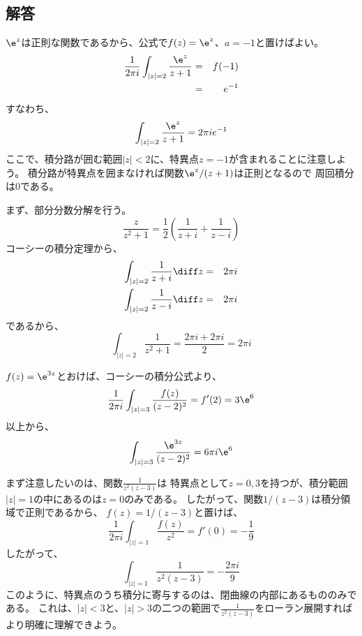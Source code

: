 \subsection{解答}

$\e^{z}$は正則な関数であるから、公式で$f(z)=\e^z$、$a=-1$と置けばよい。
\begin{eqnarray}
  \frac{1}{2\pi i} \int_{|z|=2} \frac{\e^z}{z+1} &=& f(-1)\\
  &=& e^{-1}
\end{eqnarray}
すなわち、
\begin{equation}
  \int_{|z|=2} \frac{\e^z}{z+1} = 2\pi i e^{-1}
\end{equation}
ここで、積分路が囲む範囲$|z|<2$に、特異点$z=-1$が含まれることに注意しよう。
積分路が特異点を囲まなければ関数$\e^z/(z+1)$は正則となるので
周回積分は$0$である。

まず、部分分数分解を行う。
\begin{equation}
  \frac{z}{z^2+1} = \frac{1}{2} \left( \frac{1}{z+i} + \frac{1}{z-i} \right)
\end{equation}
コーシーの積分定理から、
\begin{eqnarray}
  \int_{|z|=2} \frac{1}{z+i} \diff z & =& 2 \pi i \\
  \int_{|z|=2} \frac{1}{z-i} \diff z & =& 2 \pi i \\
\end{eqnarray}
であるから、
\begin{equation}
  \int_{|z|=2} \frac{1}{z^2+1} = \frac{2\pi i + 2\pi i}{2} = 2 \pi i
\end{equation}

$f(z) = \e^{3z}$とおけば、コーシーの積分公式より、
\begin{equation}
  \frac{1}{2\pi i} \int_{|z|=3} \frac{f(z)}{(z-2)^2} = f'(2) = 3\e^{6}
\end{equation}
以上から、
\begin{equation}
  \int_{|z|=3} \frac{\e^{3z}}{(z-2)^2} = 6 \pi i \e^{6}
\end{equation}

まず注意したいのは、関数$\displaystyle \frac{1}{z^2(z-3)}$は
特異点として$z=0,3$を持つが、積分範囲$|z|=1$の中にあるのは$z=0$のみである。
したがって、関数$1/(z-3)$は積分領域で正則であるから、
$f(z) = 1/(z-3)$と置けば、
\begin{equation}
  \frac{1}{2\pi i} \int_{|z|=1} \frac{f(z)}{z^2} = f'(0) = - \frac{1}{9}
\end{equation}
したがって、
\begin{equation}
  \int_{|z|=1} \frac{1}{z^2(z-3)} =- \frac{2 \pi i}{9}
\end{equation}
このように、特異点のうち積分に寄与するのは、閉曲線の内部にあるもののみである。
これは、$|z|<3$と、$|z|>3$の二つの範囲で$\displaystyle \frac{1}{z^2(z-3)}$をローラン展開すればより明確に理解できよう。


